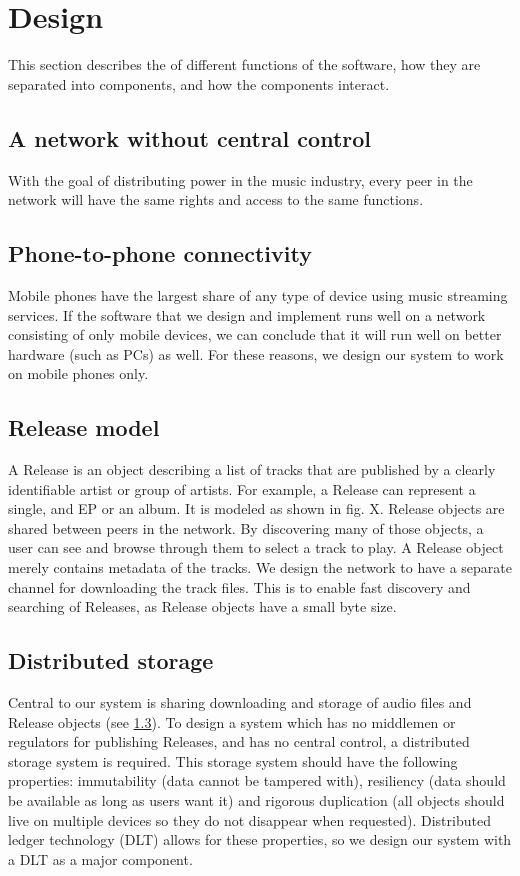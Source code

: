 \chapter{Design}
This section describes the of different functions of the software, how they are separated into components, and how the components interact.

\section{A network without central control}
With the goal of distributing power in the music industry, every peer in the network will have the same rights and access to the same functions.

\section{Phone-to-phone connectivity}
Mobile phones have the largest share of any type of device using music streaming services. If the software that we design and implement runs well on a network consisting of only mobile devices, we can conclude that it will run well on better hardware (such as PCs) as well. For these reasons, we design our system to work on mobile phones only.

\section{Release model}
\label{sec:release-model}
A Release is an object describing a list of tracks that are published by a clearly identifiable artist or group of artists. For example, a Release can represent a single, and EP or an album. It is modeled as shown in fig. X. Release objects are shared between peers in the network. By discovering many of those objects, a user can see and browse through them to select a track to play. A Release object merely contains metadata of the tracks. We design the network to have a separate channel for downloading the track files. This is to enable fast discovery and
searching of Releases, as Release objects have a small byte size. 

\section{Distributed storage}
Central to our system is sharing downloading and storage of audio files and Release objects (see \ref{sec:release-model}). To design a system which has no middlemen or regulators for publishing Releases, and has no central control, a distributed storage system is required. This storage system should have the following properties: immutability (data cannot be tampered with), resiliency (data should be available as long as users want it) and rigorous duplication (all objects should live on multiple devices so they do not disappear when requested). Distributed ledger technology (DLT) allows for these properties, so we design our system with a DLT as a major component.

